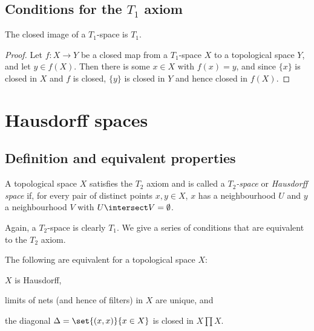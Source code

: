 \documentclass[article, a4paper, 11pt, oneside]{memoir}
\numberwithin{equation}{chapter}
\begin{document}
\section[Conditions for the T1 axiom]{Conditions for the $T_1$ axiom}

\begin{proposition}
    The closed image\footnotemark{} of a $T_1$-space is $T_1$.
\end{proposition}

\begin{proof}%
    Let $f \colon X \to Y$ be a closed map from a $T_1$-space $X$ to a topological space $Y$, and let $y \in f(X)$. Then there is some $x \in X$ with $f(x) = y$, and since $\{x\}$ is closed in $X$ and $f$ is closed, $\{y\}$ is closed in $Y$ and hence closed in $f(X)$.
\end{proof}



\chapter{Hausdorff spaces}

\section{Definition and equivalent properties}

\begin{definition}
    A topological space $X$ satisfies the $T_2$ axiom and is called a \emph{$T_2$-space} or \emph{Hausdorff space} if, for every pair of distinct points $x,y \in X$, $x$ has a neighbourhood $U$ and $y$ a neighbourhood $V$ with $U \intersect V = \emptyset$.
\end{definition}
%
Again, a $T_2$-space is clearly $T_1$. We give a series of conditions that are equivalent to the $T_2$ axiom.


\begin{proposition}
    \label{thm:Hausdorff-equivalent-properties}
    The following are equivalent for a topological space $X$:
    \begin{enumprop}
        \item \label{enum:T2-space} $X$ is Hausdorff,
        \item \label{enum:T2-limits_unique} limits of nets (and hence of filters) in $X$ are unique, and
        \item \label{enum:T2-closed_diagonal} the diagonal $\Delta = \set{(x,x)}{x \in X}$ is closed in $X \prod X$.
    \end{enumprop}
\end{proposition}
\end{document}
